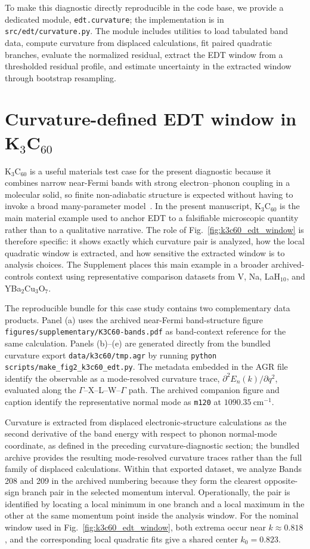 ﻿\documentclass[aps,prx,reprint,superscriptaddress,longbibliography,floatfix]{revtex4-2}
\begin{document}
To make this diagnostic directly reproducible in the code base, we provide a dedicated module, \texttt{edt.curvature}; the implementation is in \texttt{src/edt/curvature.py}. The module includes utilities to load tabulated band data, compute curvature from displaced calculations, fit paired quadratic branches, evaluate the normalized residual, extract the EDT window from a thresholded residual profile, and estimate uncertainty in the extracted window through bootstrap resampling.


\section{Curvature-defined EDT window in K$_3$C$_{60}$}

K$_3$C$_{60}$ is a useful materials test case for the present diagnostic because it combines narrow near-Fermi bands with strong electron--phonon coupling in a molecular solid, so finite non-adiabatic structure is expected without having to invoke a broad many-parameter model~\cite{Gunnarsson1997,Capone2009}. In the present manuscript, K$_3$C$_{60}$ is the main material example used to anchor EDT to a falsifiable microscopic quantity rather than to a qualitative narrative. The role of Fig.~\ref{fig:k3c60_edt_window} is therefore specific: it shows exactly which curvature pair is analyzed, how the local quadratic window is extracted, and how sensitive the extracted window is to analysis choices. The Supplement places this main example in a broader archived-controls context using representative comparison datasets from V, Na, LaH$_{10}$, and YBa$_2$Cu$_3$O$_7$.

The reproducible bundle for this case study contains two complementary data products. Panel (a) uses the archived near-Fermi band-structure figure \texttt{figures/supplementary/K3C60-bands.pdf} as band-context reference for the same calculation. Panels (b)--(e) are generated directly from the bundled curvature export \texttt{data/k3c60/tmp.agr} by running \texttt{python scripts/make\_fig2\_k3c60\_edt.py}. The metadata embedded in the AGR file identify the observable as a mode-resolved curvature trace, $\partial^2 E_n(k)/\partial q^2$, evaluated along the $\Gamma$--X--L--W--$\Gamma$ path. The archived companion figure and caption identify the representative normal mode as \texttt{m120} at $1090.35~\mathrm{cm}^{-1}$.

Curvature is extracted from displaced electronic-structure calculations as the second derivative of the band energy with respect to phonon normal-mode coordinate, as defined in the preceding curvature-diagnostic section; the bundled archive provides the resulting mode-resolved curvature traces rather than the full family of displaced calculations. Within that exported dataset, we analyze Bands 208 and 209 in the archived numbering because they form the clearest opposite-sign branch pair in the selected momentum interval. Operationally, the pair is identified by locating a local minimum in one branch and a local maximum in the other at the same momentum point inside the analysis window. For the nominal window used in Fig.~\ref{fig:k3c60_edt_window}, both extrema occur near $k \approx 0.818$, and the corresponding local quadratic fits give a shared center $k_0 = 0.823$.
\end{document}
